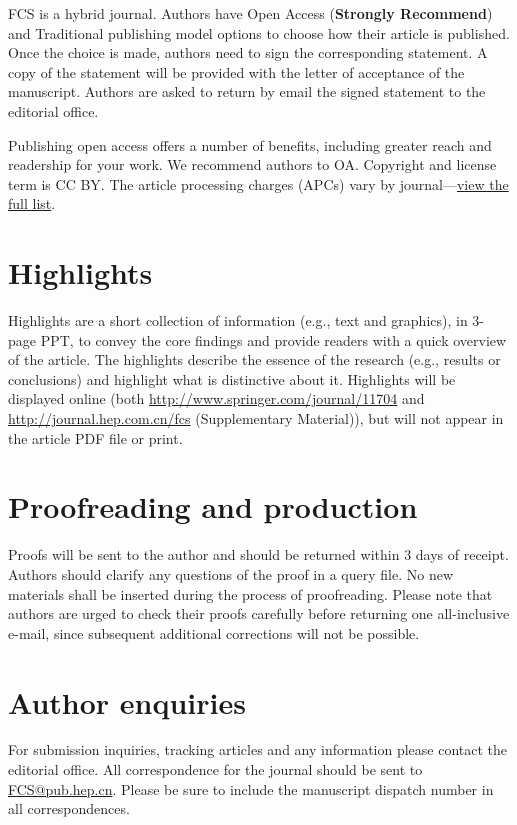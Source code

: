 \documentclass[review]{fcs}
\begin{document}
FCS is a hybrid journal. Authors have Open Access (\textbf{Strongly Recommend}) and Traditional publishing model options to choose how their article is published. Once the choice is made, authors need to sign the corresponding statement. A copy of the statement will be provided with the letter of acceptance of the manuscript. Authors are asked to return by email the signed statement to the editorial office.

Publishing open access offers a number of benefits, including greater reach and readership for your work. We recommend authors to OA. Copyright and license term is CC BY. The article processing charges (APCs) vary by journal---\href{https://www.springernature.com/de/open-research/journals-books/journals}{view the full list}.

\section{Highlights}

Highlights are a short collection of information (e.g., text and graphics), in 3-page PPT, to convey the core findings and provide readers with a quick over\-view of the article. The highlights describe the essence of the research (e.g., results or conclusions) and highlight what is distinctive about it. Highlights will be displayed online (both \url{http://www.springer.com/journal/11704} and \url{http://journal.hep.com.cn/fcs} (Supplementary Material)), but will not appear in the article PDF file or print.

\section{Proofreading and production}

Proofs will be sent to the author and should be returned within 3 days of receipt. Authors should clarify any questions of the proof in a query file. No new materials shall be inserted during the process of proofreading. Please note that authors are urged to check their proofs carefully before returning one all-inclusive e-mail, since subsequent additional corrections will not be possible.

\section{Author enquiries}

For submission inquiries, tracking articles and any information please contact the editorial office. All correspondence for the journal should be sent to \url{FCS@pub.hep.cn}. Please be sure to include the manuscript dispatch number in all correspondences.
\end{document}
